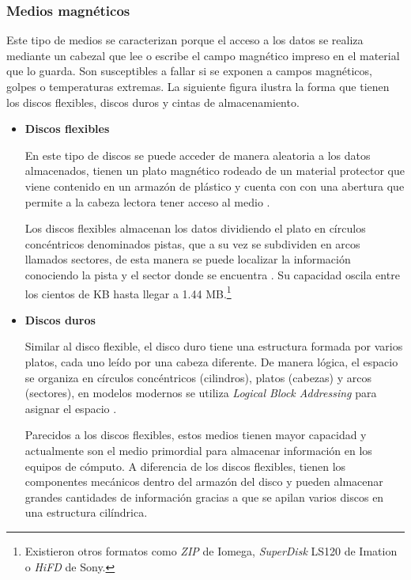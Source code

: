 \newpage
      \subsubsection*{Medios magn\'{e}ticos}

Este tipo de medios se caracterizan porque el acceso a los datos se realiza mediante un cabezal que lee o escribe el campo magn\'{e}tico impreso en el material que lo guarda. Son susceptibles a fallar si se exponen a campos magn\'{e}ticos, golpes o temperaturas extremas. La siguiente figura ilustra la forma que tienen los discos flexibles, discos duros y cintas de almacenamiento.

\begin{itemize}
  \item \textbf{Discos flexibles}

En este tipo de discos se puede acceder de manera aleatoria a los datos almacenados, tienen un plato magn\'{e}tico rodeado de un material protector que viene contenido en un armaz\'{o}n de pl\'{a}stico y cuenta con con una abertura que permite a la cabeza lectora tener acceso al medio \cite{_anatomy_????}.

Los discos flexibles almacenan los datos dividiendo el plato en c\'{i}rculos conc\'{e}ntricos denominados pistas, que a su vez se subdividen en arcos llamados sectores, de esta manera se puede localizar la informaci\'{o}n conociendo la pista y el sector donde se encuentra \cite{_illustrated_????}. Su capacidad oscila entre los cientos de \textsc{\gls{KB}} hasta llegar a 1.44 \textsc{\gls{MB}}.\footnote{Existieron otros formatos como \textit{ZIP} de Iomega, \textit{SuperDisk} LS120 de Imation o \textit{HiFD} de Sony.}

  \item \textbf{Discos duros}

Similar al disco flexible, el disco duro tiene una estructura formada por varios platos, cada uno le\'{i}do por una cabeza diferente. De manera l\'{o}gica, el espacio se organiza en c\'{i}rculos conc\'{e}ntricos (cilindros), platos (cabezas) y arcos (sectores), en modelos modernos se utiliza \emph{Logical Block Addressing} para asignar el espacio \cite{_introduction_????}.

Parecidos a los discos flexibles, estos medios tienen mayor capacidad y actualmente son el medio primordial para almacenar informaci\'{o}n en los equipos de c\'{o}mputo. A diferencia de los discos flexibles, tienen los componentes mec\'{a}nicos dentro del armaz\'{o}n del disco y pueden almacenar grandes cantidades de informaci\'{o}n gracias a que se apilan varios discos en una estructura cil\'{i}ndrica.


\end{itemize}

